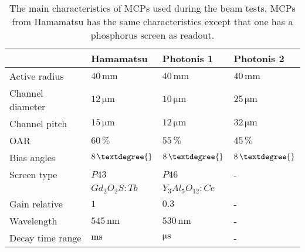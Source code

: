 \begin{table}[ht]
  \centering
  \caption[The main characteristics of MCPs used during the beam tests]{The main characteristics of MCPs used during the beam tests. MCPs from Hamamatsu has the same characteristics except that one has a phosphorus screen as readout.}
  \label{chap4:MCP_Phosphor}
  \begin{tabular}{llll}
    \toprule
                     & Hamamatsu         & Photonis 1                  & Photonis 2                  \\
    \midrule
    Active radius    & $40\,\mathrm{mm}$           & $40\,\mathrm{mm}$           & $40\,\mathrm{mm}$           \\
    Channel diameter & $12\,\mathrm{\mu m}$        & $10\,\mathrm{\mu m}$        & $25\,\mathrm{\mu m}$        \\
    Channel pitch    & $15\,\mathrm{\mu m}$        & $12\,\mathrm{\mu m}$        & $32\,\mathrm{\mu m}$        \\
    OAR              & $60\,\mathrm{\%}$           & $55\,\mathrm{\%}$           & $45\,\mathrm{\%}$           \\
    Bias angles      & $8\,\mathrm{\textdegree{}}$ & $8\,\mathrm{\textdegree{}}$ & $8\,\mathrm{\textdegree{}}$ \\
    \midrule
    Screen type      & $P43$                  & $P46$                       & -                           \\
                     & $Gd_{2}O_{2}S:Tb$           & $Y_{3}Al_{5}O_{12}:Ce$      &                             \\
    Gain relative    & $1$                      & $0.3$                       & -                           \\
    Wavelength       & $545\,\mathrm{nm}$      & $530\,\mathrm{nm}$          & -                           \\
    Decay time range & $\mathrm{ms}$           & $\mathrm{\mu s}$            & -                           \\
    \bottomrule
  \end{tabular}
\end{table}